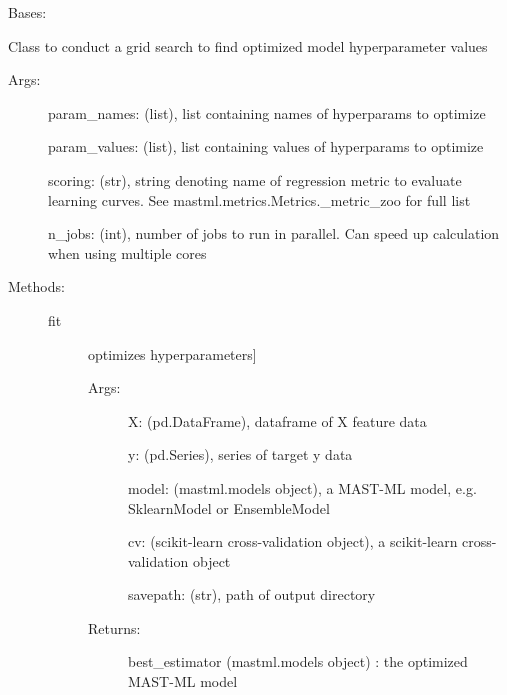 \documentclass[letterpaper,10pt,english]{sphinxmanual}
\begin{document}
\begin{fulllineitems}
\label{\detokenize{api/mastml.hyper_opt.GridSearch:mastml.hyper_opt.GridSearch}}
Bases: {\hyperref[\detokenize{api/mastml.hyper_opt.HyperOptUtils:mastml.hyper_opt.HyperOptUtils}]{}}

Class to conduct a grid search to find optimized model hyperparameter values
\begin{description}
\item[{Args:}] \leavevmode
param\_names: (list), list containing names of hyperparams to optimize

param\_values: (list), list containing values of hyperparams to optimize

scoring: (str), string denoting name of regression metric to evaluate learning curves. See mastml.metrics.Metrics.\_metric\_zoo for full list

n\_jobs: (int), number of jobs to run in parallel. Can speed up calculation when using multiple cores

\item[{Methods:}] \leavevmode\begin{description}
\item[{fit}] \leavevmode{[}optimizes hyperparameters{]}\begin{description}
\item[{Args:}] \leavevmode
X: (pd.DataFrame), dataframe of X feature data

y: (pd.Series), series of target y data

model: (mastml.models object), a MAST-ML model, e.g. SklearnModel or EnsembleModel

cv: (scikit-learn cross-validation object), a scikit-learn cross-validation object

savepath: (str), path of output directory

\item[{Returns:}] \leavevmode
best\_estimator (mastml.models object) : the optimized MAST-ML model

\end{description}

\end{description}

\end{description}

\end{fulllineitems}
\end{document}
